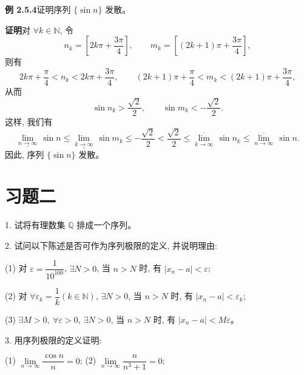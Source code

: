 \documentclass[UTF8, 12pt, fontset=fandol, oneside]{ctexart}
\begin{document}
\noindent\textbf{例 2.5.4}\quad 证明序列 $\{\sin n\}$ 发散。

\noindent\textbf{证明}\quad 对 $\forall k\in\mathbb{N}$, 令
\[
  n_k=\left[2k\pi+\frac{3\pi}{4}\right],
  \qquad
  m_k=\left[(2k+1)\pi+\frac{3\pi}{4}\right],
\]
则有
\[
  2k\pi+\frac\pi4<n_k<2k\pi+\frac{3\pi}{4},
  \qquad
  (2k+1)\pi+\frac\pi4<m_k<(2k+1)\pi+\frac{3\pi}{4},
\]
从而
\[
  \sin n_k>\frac{\sqrt2}{2},
  \qquad
  \sin m_k<-\frac{\sqrt2}{2}.
\]
这样, 我们有
\[
  \underline{\lim_{n\to\infty}}\,\sin n
  \leqslant
  \underline{\lim_{k\to\infty}}\,\sin m_k
  \leqslant
  -\frac{\sqrt2}{2}
  <
  \frac{\sqrt2}{2}
  \leqslant
  \overline{\lim_{k\to\infty}}\,\sin n_k
  \leqslant
  \overline{\lim_{n\to\infty}}\,\sin n.
\]
因此, 序列 $\{\sin n\}$ 发散。

\section*{习题二}

1. 试将有理数集 $\mathbb{Q}$ 排成一个序列。

2. 试问以下陈述是否可作为序列极限的定义, 并说明理由:

(1) 对 $\varepsilon=\dfrac1{10^{100}}$, $\exists N>0$, 当 $n>N$ 时, 有 $|x_n-a|<\varepsilon$;

(2) 对 $\forall\varepsilon_k=\dfrac1k(k\in\mathbb{N})$, $\exists N>0$, 当 $n>N$ 时, 有 $|x_n-a|<\varepsilon_k$;

(3) $\exists M>0,\ \forall\varepsilon>0,\ \exists N>0$, 当 $n>N$ 时, 有 $|x_n-a|<M\varepsilon$。

3. 用序列极限的定义证明:

(1) $\lim\limits_{n\to\infty}\dfrac{\cos n}{n}=0$;\qquad
(2) $\lim\limits_{n\to\infty}\dfrac{n}{n^3+1}=0$;
\end{document}
